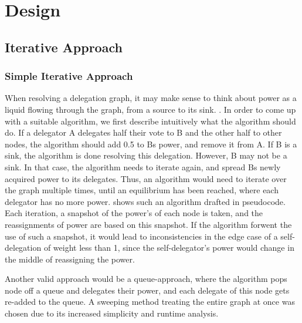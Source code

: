 \graphicspath{ {./figures/} }

\chapter{Design}
\label{sec:design}

\section{Iterative Approach}
\label{sec:iterative_approach}

\subsection{Simple Iterative Approach}

When resolving a delegation graph, it may make sense to think about power as a liquid flowing through the graph, from a source to its sink. . In order to come up with a suitable algorithm, we first describe intuitively what the algorithm should do. If a delegator A delegates half their vote to B and the other half to other nodes, the algorithm should add 0.5 to Bs power, and remove it from A. If B is a sink, the algorithm is done resolving this delegation. However,  B may not be a sink. In that case, the algorithm needs to iterate again, and spread Bs newly acquired power to its delegates. Thus, an algorithm would need to iterate over the graph multiple times, until an equilibrium has been reached, where each delegator has no more power.  shows such an algorithm drafted in pseudocode. Each iteration, a snapshot of the power's of each node is taken, and the reassignments of power are based on this snapshot. If the algorithm forwent the use of such a snapshot, it would lead to inconsistencies in the edge case of a self-delegation of weight less than 1, since the self-delegator's power would change in the middle of reassigning the power. 

Another valid approach would be a queue-approach, where the algorithm pops node off a queue and delegates their power, and each delegate of this node gets re-added to the queue. A sweeping method treating the entire graph at once was chosen due to its increased simplicity and runtime analysis.

